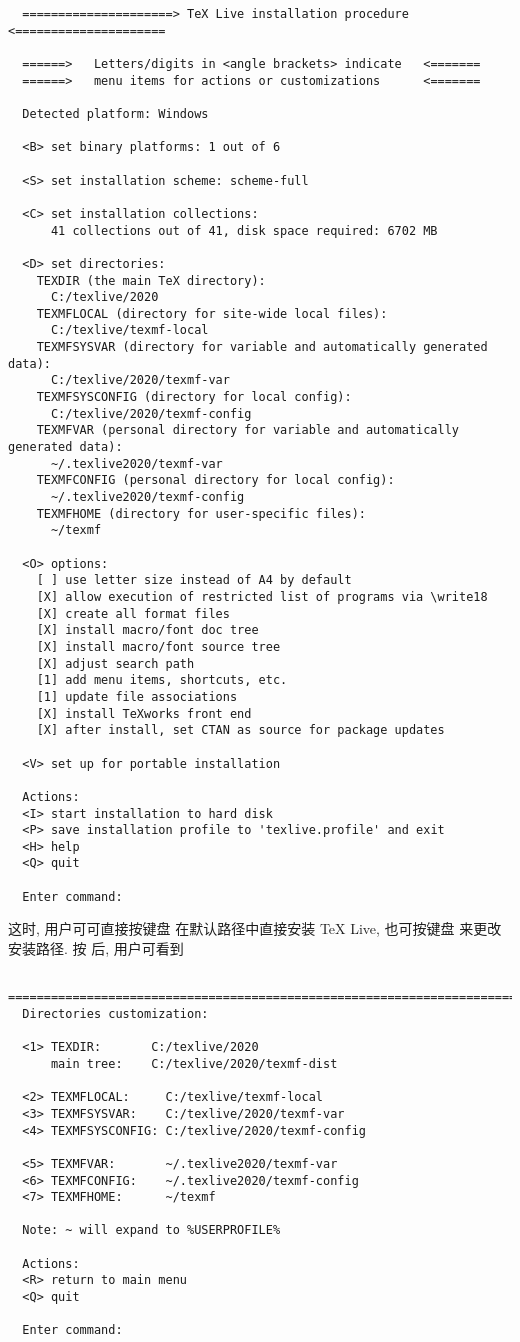 \begin{lstlisting}
  =====================> TeX Live installation procedure <=====================
  
  ======>   Letters/digits in <angle brackets> indicate   <=======
  ======>   menu items for actions or customizations      <=======
  
  Detected platform: Windows
  
  <B> set binary platforms: 1 out of 6
  
  <S> set installation scheme: scheme-full
  
  <C> set installation collections:
      41 collections out of 41, disk space required: 6702 MB
  
  <D> set directories:
    TEXDIR (the main TeX directory):
      C:/texlive/2020
    TEXMFLOCAL (directory for site-wide local files):
      C:/texlive/texmf-local
    TEXMFSYSVAR (directory for variable and automatically generated data):
      C:/texlive/2020/texmf-var
    TEXMFSYSCONFIG (directory for local config):
      C:/texlive/2020/texmf-config
    TEXMFVAR (personal directory for variable and automatically generated data):
      ~/.texlive2020/texmf-var
    TEXMFCONFIG (personal directory for local config):
      ~/.texlive2020/texmf-config
    TEXMFHOME (directory for user-specific files):
      ~/texmf
  
  <O> options:
    [ ] use letter size instead of A4 by default
    [X] allow execution of restricted list of programs via \write18
    [X] create all format files
    [X] install macro/font doc tree
    [X] install macro/font source tree
    [X] adjust search path
    [1] add menu items, shortcuts, etc.
    [1] update file associations
    [X] install TeXworks front end
    [X] after install, set CTAN as source for package updates
  
  <V> set up for portable installation
  
  Actions:
  <I> start installation to hard disk
  <P> save installation profile to 'texlive.profile' and exit
  <H> help
  <Q> quit
  
  Enter command:
\end{lstlisting}
这时, 用户可可直接按键盘  在默认路径中直接安装 \TeX{} Live,
也可按键盘  来更改安装路径.
按  后, 用户可看到
\begin{lstlisting}
  ==============================================================================
  Directories customization:
  
  <1> TEXDIR:       C:/texlive/2020
      main tree:    C:/texlive/2020/texmf-dist
  
  <2> TEXMFLOCAL:     C:/texlive/texmf-local
  <3> TEXMFSYSVAR:    C:/texlive/2020/texmf-var
  <4> TEXMFSYSCONFIG: C:/texlive/2020/texmf-config
  
  <5> TEXMFVAR:       ~/.texlive2020/texmf-var
  <6> TEXMFCONFIG:    ~/.texlive2020/texmf-config
  <7> TEXMFHOME:      ~/texmf
  
  Note: ~ will expand to %USERPROFILE%
  
  Actions:
  <R> return to main menu
  <Q> quit
  
  Enter command:
\end{lstlisting}
